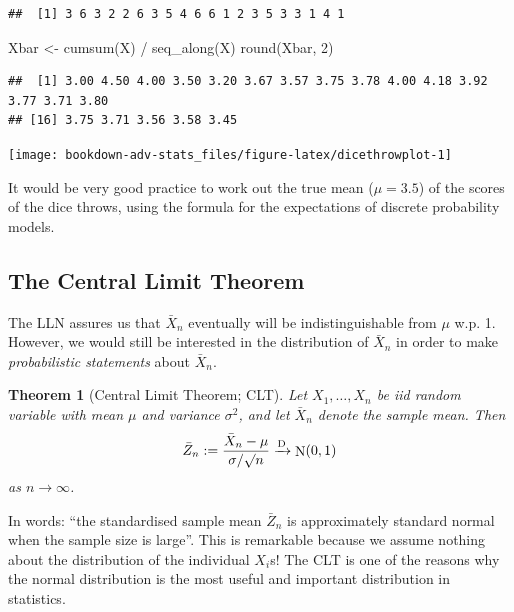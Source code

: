 \documentclass[
]{book}
\newenvironment{Shaded}{\begin{snugshade}}{\end{snugshade}}
\newcommand{\DecValTok}[1]{\textcolor[rgb]{0.00,0.00,0.81}{#1}}
\newcommand{\FunctionTok}[1]{\textcolor[rgb]{0.00,0.00,0.00}{#1}}
\newcommand{\NormalTok}[1]{#1}
\newcommand{\OtherTok}[1]{\textcolor[rgb]{0.56,0.35,0.01}{#1}}
\newcommand{\SpecialCharTok}[1]{\textcolor[rgb]{0.00,0.00,0.00}{#1}}
\DeclareMathOperator{\N}{N}
\newtheorem{theorem}{Theorem}[chapter]
\theoremstyle{definition}
\theoremstyle{definition}
\theoremstyle{definition}
\theoremstyle{definition}
\theoremstyle{remark}
\begin{document}
\begin{verbatim}
##  [1] 3 6 3 2 2 6 3 5 4 6 6 1 2 3 5 3 3 1 4 1
\end{verbatim}

\begin{Shaded}
\begin{Highlighting}[]
\NormalTok{Xbar }\OtherTok{\textless{}{-}} \FunctionTok{cumsum}\NormalTok{(X) }\SpecialCharTok{/} \FunctionTok{seq\_along}\NormalTok{(X)}
\FunctionTok{round}\NormalTok{(Xbar, }\DecValTok{2}\NormalTok{)}
\end{Highlighting}
\end{Shaded}

\begin{verbatim}
##  [1] 3.00 4.50 4.00 3.50 3.20 3.67 3.57 3.75 3.78 4.00 4.18 3.92 3.77 3.71 3.80
## [16] 3.75 3.71 3.56 3.58 3.45
\end{verbatim}

\begin{center}\texttt{[image: bookdown-adv-stats\_files/figure-latex/dicethrowplot-1]} \end{center}

It would be very good practice to work out the true mean (\(\mu=3.5\)) of the scores of the dice throws, using the formula for the expectations of discrete probability models.

\hypertarget{the-central-limit-theorem}{%
\subsection{The Central Limit Theorem}\label{the-central-limit-theorem}}

The LLN assures us that \(\bar X_n\) eventually will be indistinguishable from \(\mu\) w.p. 1.
However, we would still be interested in the distribution of \(\bar X_n\) in order to make \emph{probabilistic statements} about \(\bar X_n\).

\begin{theorem}[Central Limit Theorem; CLT]
Let \(X_1,\dots,X_n\) be iid random variable with mean \(\mu\) and variance \(\sigma^2\), and let \(\bar X_n\) denote the sample mean. Then
\[
\bar Z_n := \frac{\bar X_n - \mu}{\sigma/\surd n} \xrightarrow{\text D} \N(0,1)
\]
as \(n\to \infty\).
\end{theorem}

In words: ``the standardised sample mean \(\bar Z_n\) is approximately standard normal when the sample size is large''.
This is remarkable because we assume nothing about the distribution of the individual \(X_i\)s!
The CLT is one of the reasons why the normal distribution is the most useful and important distribution in statistics.
\end{document}
